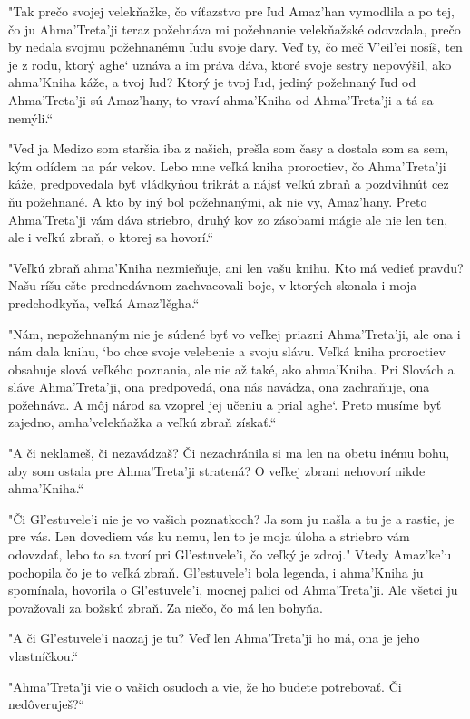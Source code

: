 \documentclass{book}
\begin{document}
"$ $Tak prečo svojej velekňažke, čo víťazstvo pre ľud Amaz'han vymodlila a po tej, čo ju Ahma'Treta'ji teraz požehnáva mi požehnanie velekňažské odovzdala, prečo by nedala svojmu požehnanému ľudu svoje dary. Veď ty, čo meč V'eil'ei nosíš, ten je z rodu, ktorý aghe‘ uznáva a im práva dáva, ktoré svoje sestry nepovýšil, ako ahma'Kniha káže, a tvoj ľud? Ktorý je tvoj ľud, jediný požehnaný ľud od Ahma'Treta'ji sú Amaz'hany, to vraví ahma'Kniha od Ahma'Treta'ji a tá sa nemýli.“

"$ $Veď ja Medizo som staršia iba z našich, prešla som časy a dostala som sa sem, kým odídem na pár vekov. Lebo mne veľká kniha proroctiev, čo Ahma'Treta'ji káže, predpovedala byť vládkyňou trikrát a nájsť veľkú zbraň a pozdvihnúť cez ňu požehnané. A kto by iný bol požehnanými, ak nie vy, Amaz'hany. Preto Ahma'Treta'ji vám dáva striebro, druhý kov zo zásobami mágie ale nie len ten, ale i veľkú zbraň, o ktorej sa hovorí.“

"$ $Veľkú zbraň ahma'Kniha nezmieňuje, ani len vašu knihu. Kto má vedieť pravdu? Našu ríšu ešte prednedávnom zachvacovali boje, v ktorých skonala i moja predchodkyňa, veľká Amaz'le\v{}gha.“

"$ $Nám, nepožehnaným nie je súdené byť vo veľkej priazni Ahma'Treta'ji, ale ona i nám dala knihu, ‘bo chce svoje velebenie a svoju slávu. Veľká kniha proroctiev obsahuje slová veľkého poznania, ale nie až také, ako ahma'Kniha. Pri Slovách a sláve Ahma'Treta'ji, ona predpovedá, ona nás navádza, ona zachraňuje, ona požehnáva. A môj národ sa vzoprel jej učeniu a prial aghe‘. Preto musíme byť zajedno, amha'velekňažka a veľkú zbraň získať.“

"$ $A či neklameš, či nezavádzaš? Či nezachránila si ma len na obetu inému bohu, aby som ostala pre Ahma'Treta'ji stratená? O veľkej zbrani nehovorí nikde ahma'Kniha.“

"$ $Či Gl'estuvele'i nie je vo vašich poznatkoch? Ja som ju našla a tu je a rastie, je pre vás. Len dovediem vás ku nemu, len to je moja úloha a striebro vám odovzdať, lebo to sa tvorí pri Gl'estuvele'i, čo veľký je zdroj."$ $ Vtedy Amaz'ke'u pochopila čo je to veľká zbraň. Gl'estuvele'i bola legenda, i ahma'Kniha ju spomínala, hovorila o Gl'estuvele'i, mocnej palici od Ahma'Treta'ji. Ale všetci ju považovali za božskú zbraň. Za niečo, čo má len bohyňa.

"$ $A či Gl'estuvele'i naozaj je tu? Veď len Ahma'Treta'ji ho má, ona je jeho vlastníčkou.“

"$ $Ahma'Treta'ji vie o vašich osudoch a vie, že ho budete potrebovať. Či nedôveruješ?“
\end{document}

